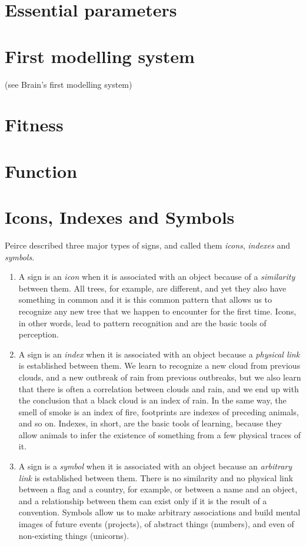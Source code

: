 \documentclass[12pt]{article}
\begin{document}
\hypertarget{essential_parameters}{}
\section{Essential parameters}

\section{First modelling system} (see Brain's first modelling system)

\hypertarget{fitness}{}
\section{Fitness}

\hypertarget{function}{}
\section{Function}

\section{Icons, Indexes and Symbols}
Peirce described three major types of signs, and called them \textit{icons}, \textit{indexes} and \textit{symbols}.
\begin{enumerate}
\item A sign is an \textit{icon} when it is associated with an object because of a \textit{similarity} between them. All trees, for example, are different, and yet they also have something in common and it is this common pattern that allows us to recognize any new tree that we happen to encounter for the first time. Icons, in other words, lead to pattern recognition and are the basic tools of perception. 

\item A sign is an \textit{index} when it is associated with an object because a \textit{physical link} is established between them. We learn to recognize a new cloud from previous clouds, and a new outbreak of rain from previous outbreaks, but we also learn that there is often a correlation between clouds and rain, and we end up with the conclusion that a black cloud is an index of rain. In the same way, the smell of smoke is an index of fire, footprints are indexes of preceding animals, and so on. Indexes, in short, are the basic tools of learning, because they allow animals to infer the existence of something from a few physical traces of it.

\item A sign is a \textit{symbol} when it is associated with an object because an \textit{arbitrary link} is established between them. There is no similarity and no physical link between a flag and a country, for example, or between a name and an object, and a relationship between them can exist only if it is the result of a convention. Symbols allow us to make arbitrary associations and build mental images of future events (projects), of abstract things (numbers), and even of non-existing things (unicorns). 
\end{enumerate}
\end{document}
